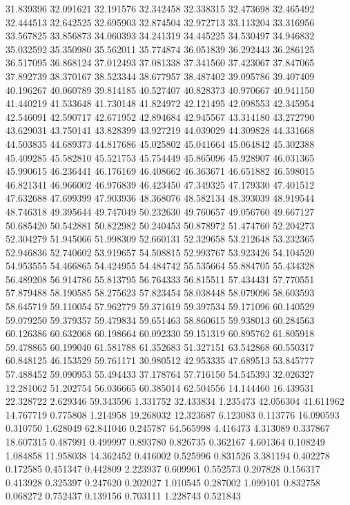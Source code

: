 31.839396
32.091621
32.191576
32.342458
32.338315
32.473698
32.465492
32.444513
32.642525
32.695903
32.874504
32.972713
33.113204
33.316956
33.567825
33.856873
34.060393
34.241319
34.445225
34.530497
34.946832
35.032592
35.350980
35.562011
35.774874
36.051839
36.292443
36.286125
36.517095
36.868124
37.012493
37.081338
37.341560
37.423067
37.847065
37.892739
38.370167
38.523344
38.677957
38.487402
39.095786
39.407409
40.196267
40.060789
39.814185
40.527407
40.828373
40.970667
40.941150
41.440219
41.533648
41.730148
41.824972
42.121495
42.098553
42.345954
42.546091
42.590717
42.671952
42.894684
42.945567
43.314180
43.272790
43.629031
43.750141
43.828399
43.927219
44.039029
44.309828
44.331668
44.503835
44.689373
44.817686
45.025802
45.041664
45.064842
45.302388
45.409285
45.582810
45.521753
45.754449
45.865096
45.928907
46.031365
45.990615
46.236441
46.176169
46.408662
46.363671
46.651882
46.598015
46.821341
46.966002
46.976839
46.423450
47.349325
47.179330
47.401512
47.632688
47.699399
47.903936
48.368076
48.582134
48.393039
48.919544
48.746318
49.395644
49.747049
50.232630
49.760657
49.056760
49.667127
50.685420
50.542881
50.822982
50.240453
50.878972
51.474760
52.204273
52.304279
51.945066
51.998309
52.660131
52.329658
53.212648
53.232365
52.946836
52.740602
53.919657
54.508815
52.993767
53.923426
54.104520
54.953555
54.466865
54.424955
54.484742
55.535664
55.884705
55.434328
56.489208
56.914786
55.813795
56.764333
56.815511
57.434431
57.770551
57.879488
58.190585
58.275623
57.823454
58.038448
58.079096
58.603593
58.645719
59.110054
57.962779
59.371619
59.397534
59.171096
60.140529
59.079250
59.379357
59.479834
59.651463
58.860615
59.938013
60.284563
60.126386
60.632068
60.198664
60.092330
59.151319
60.895762
61.805918
59.478865
60.199040
61.581788
61.352683
51.327151
63.542868
60.550317
60.848125
46.153529
59.761171
30.980512
42.953335
47.689513
53.845777
57.488452
59.090953
55.494433
37.178764
57.716150
54.545393
32.026327
12.281062
51.202754
56.036665
60.385014
62.504556
14.144460
16.439531
22.328722
2.629346
59.343596
1.331752
32.433834
1.235473
42.056304
41.611962
14.767719
0.775808
1.214958
19.268032
12.323687
6.123083
0.113776
16.090593
0.310750
1.628049
62.841046
0.245787
64.565998
4.416473
4.313089
0.337867
18.607315
0.487991
0.499997
0.893780
0.826735
0.362167
4.601364
0.108249
1.084858
11.958038
14.362452
0.416002
0.525996
0.831526
3.381194
0.402278
0.172585
0.451347
0.442809
2.223937
0.609961
0.552573
0.207828
0.156317
0.413928
0.325397
0.247620
0.202027
1.010545
0.287002
1.099101
0.832758
0.068272
0.752437
0.139156
0.703111
1.228743
0.521843
